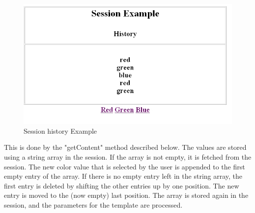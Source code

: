 \begin{figure}
\begin{center}
\includegraphics[clip,width=\sgw]{pics/modules/37}
\end{center}
\caption[Session history Example]{Session history Example}
\label{SessionExample4}
\end{figure}

This is done by the {\meth "getContent"} method described below. The values are
stored using a string array in the session. If the array is not empty,
it is fetched from the session. The new color value that is selected by
the user is appended to the first empty entry of the array. If there is
no empty entry left in the string array, the first entry is deleted by
shifting the other entries up by one position. The new entry is moved to
the (now empty) last position. The array is stored again in the session,
and the parameters for the template are processed.

